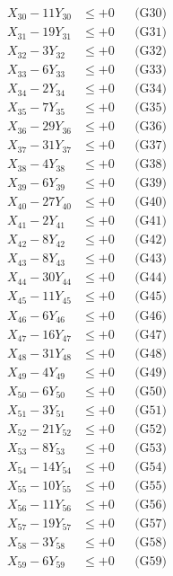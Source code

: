 \documentclass[a4paper,10pt]{article}
\begin{document}
{\begin{align}
X_{30} - 11Y_{30} &\leq +0 && \text{(G30)} \\
X_{31} - 19Y_{31} &\leq +0 && \text{(G31)} \\
X_{32} - 3Y_{32} &\leq +0 && \text{(G32)} \\
X_{33} - 6Y_{33} &\leq +0 && \text{(G33)} \\
\allowbreak
X_{34} - 2Y_{34} &\leq +0 && \text{(G34)} \\
X_{35} - 7Y_{35} &\leq +0 && \text{(G35)} \\
X_{36} - 29Y_{36} &\leq +0 && \text{(G36)} \\
X_{37} - 31Y_{37} &\leq +0 && \text{(G37)} \\
X_{38} - 4Y_{38} &\leq +0 && \text{(G38)} \\
X_{39} - 6Y_{39} &\leq +0 && \text{(G39)} \\
X_{40} - 27Y_{40} &\leq +0 && \text{(G40)} \\
X_{41} - 2Y_{41} &\leq +0 && \text{(G41)} \\
X_{42} - 8Y_{42} &\leq +0 && \text{(G42)} \\
X_{43} - 8Y_{43} &\leq +0 && \text{(G43)} \\
\allowbreak
X_{44} - 30Y_{44} &\leq +0 && \text{(G44)} \\
X_{45} - 11Y_{45} &\leq +0 && \text{(G45)} \\
X_{46} - 6Y_{46} &\leq +0 && \text{(G46)} \\
X_{47} - 16Y_{47} &\leq +0 && \text{(G47)} \\
X_{48} - 31Y_{48} &\leq +0 && \text{(G48)} \\
X_{49} - 4Y_{49} &\leq +0 && \text{(G49)} \\
X_{50} - 6Y_{50} &\leq +0 && \text{(G50)} \\
X_{51} - 3Y_{51} &\leq +0 && \text{(G51)} \\
X_{52} - 21Y_{52} &\leq +0 && \text{(G52)} \\
X_{53} - 8Y_{53} &\leq +0 && \text{(G53)} \\
\allowbreak
X_{54} - 14Y_{54} &\leq +0 && \text{(G54)} \\
X_{55} - 10Y_{55} &\leq +0 && \text{(G55)} \\
X_{56} - 11Y_{56} &\leq +0 && \text{(G56)} \\
X_{57} - 19Y_{57} &\leq +0 && \text{(G57)} \\
X_{58} - 3Y_{58} &\leq +0 && \text{(G58)} \\
X_{59} - 6Y_{59} &\leq +0 && \text{(G59)} \\

\end{align}}
\end{document}
